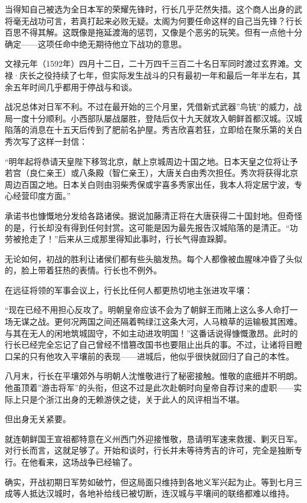 \documentclass[
]{book}
\begin{document}
当得知自己被选为全日本军的荣耀先锋时，行长几乎茫然失措。这个商人出身的武将毫无战功可言，若真打起来必败无疑。太阁为何要任命这样的自己当先锋？行长百思不得其解。这既像是拖延渡海的惩罚，又像是个恶劣的玩笑。但有一点他十分确定------这项任命中绝无期待他立下战功的意思。

文禄元年（1592年）四月十二日，二十万四千三百二十名日军同时渡过玄界滩。文禄·庆长之役持续了七年，但实际发生战斗的只有最初一年和最后一年半左右，其余五年时间几乎都用于停战与和谈。

战况总体对日军不利。不过在最开始的三个月里，凭借新式武器''鸟铳''的威力，战局一度十分顺利。小西部队屡战屡胜，登陆后仅十九天就攻入朝鲜首都汉城。汉城陷落的消息在十五天后传到了肥前名护屋。秀吉欣喜若狂，立即给在聚乐第的关白秀次写了这样一封信：

``明年起将恭请天皇陛下移驾北京，献上京城周边十国之地。日本天皇之位将让予若宫（良仁亲王）或八条殿（智仁亲王），大唐关白由秀次担任。秀次将获得北京周边百国之地。日本关白则由羽柴秀保或宇喜多秀家出任，我本人将定居宁波，专心经营印度方面。''

承诺书也慷慨地分发给各路诸侯。据说加藤清正将在大唐获得二十国封地。但奇怪的是，行长却没有得到任何封赏。这可能是因为最先报告汉城陷落的是清正。``功劳被抢走了！''后来从三成那里得知此事时，行长气得直跺脚。

无论如何，初战的胜利让诸侯们都有些头脑发热。每个人都像被血腥味冲昏了头似的，脸上带着狂热的表情。行长也不例外。

在远征将领的军事会议上，行长比任何人都更热切地主张进攻平壤：

``现在已经不用担心反攻了。明朝皇帝应该不会为了朝鲜王而赌上这么多人命打一场无谋之战。更何况两国之间还隔着鸭绿江这条大河，人马粮草的运输极其困难。与其在无人的闲地筑城固守，不如主动进攻明国！''这番话说得慷慨激昂。此时的行长已经完全忘记了自己曾经不惜篡改国书也要阻止出兵的事。不过，让诸将目瞪口呆的只有他攻入平壤前的表现------进城后，他似乎很快就回归了自己的本性。

八月末，行长在平壤郊外与明朝人沈惟敬进行了秘密接触。惟敬的底细并不明朗。他虽顶着''游击将军''的头衔，但这不过是此次赴朝时向皇帝自荐讨来的虚职------实际上只是个浙江出身的无赖游侠之徒，关于此人的风评相当不堪。

但出身无关紧要。

就连朝鲜国王宣祖都特意在义州西门外迎接惟敬，恳请明军速来救援、剿灭日军。对行长而言，这就足够了。开始和谈时，行长并未等待秀吉的许可，完全是独断专行。在他看来，这场战争已经输了。

确实，开战初期日军势如破竹，但这局面只维持到各地义军兴起为止。等到七月三成等人抵达汉城时，各地补给线已被切断，连汉城与平壤间的联络都难以维持。
\end{document}

